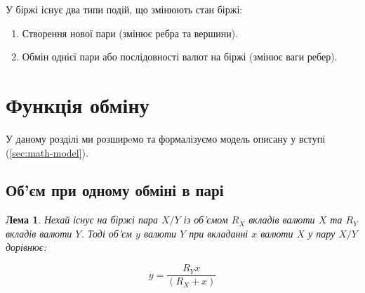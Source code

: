 \documentclass[14pt]{extarticle}
\newtheorem{lemma}{Лема}
\begin{document}
У біржі існує два типи подій, що змінюють стан біржі:

\begin{enumerate}
  \item Створення нової пари (змінює ребра та вершини).
  \item Обмін однієї пари або послідовності валют на біржі (змінює ваги ребер).
\end{enumerate}

\newpage

\section{Функція обміну}

У даному розділі ми розширeмо та формалізуємо модель описану у вступі
(\ref{sec:math-model}).

\subsection{Об'єм при одному обміні в парі}

\begin{lemma} Нехай існує на біржі пара \(X/Y\) із об'ємом \(R_{X}\) вкладів
	валюти \(X\) та \(R_{Y}\) вкладів валюти \(Y\). Тоді об'єм \(y\) валюти \(Y\)
	при вкладанні \(x\) валюти \(X\) у пару \(X/Y\) дорівнює:

	\begin{equation}\label{eq:swap}
		y = \frac{R_{Y}x}{(R_{X} + x)}
	\end{equation}
\end{lemma}
\end{document}
